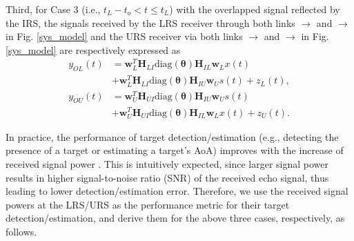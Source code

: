 \documentclass[10pt,final,doublecolumn]{IEEEtran}
\begin{document}
Third, for Case 3 (i.e., $t_L-t_o<t \leq t_L$) with the overlapped signal reflected by the IRS, the signals received by the LRS receiver through both links $\rightarrow$ and $\rightarrow$ in Fig. \ref{sys_model} and the URS
receiver via both links $\rightarrow$ and $\rightarrow$ in Fig. \ref{sys_model} are respectively expressed as
\begin{align}
y_{OL}(t)&=\mathbf{w}_{{L}}^T\mathbf{H}_{LI}
\text{diag}(\boldsymbol{\theta})\mathbf{H}_{IL}\mathbf{w}_{{L}}x(t)\nonumber\\
&+\mathbf{w}_{{L}}^T\mathbf{H}_{LI}\text{diag}(\boldsymbol{\theta})\mathbf{H}_{IU}
\mathbf{w}_{{U}}s(t)+z_{L}(t),\label{lrs3}\\
y_{OU}(t)&=\mathbf{w}_{{U}}^T\mathbf{H}_{UI}
\text{diag}(\boldsymbol{\theta})\mathbf{H}_{IU}\mathbf{w}_{{U}}s(t)\nonumber\\
&+\mathbf{w}_{{U}}^T\mathbf{H}_{UI}\text{diag}(\boldsymbol{\theta})\mathbf{H}_{IL}
\mathbf{w}_{{L}}x(t)+z_{U}(t).\label{lrs33}
\end{align}

In practice, the performance of target detection/estimation (e.g., detecting the presence of a target or estimating a target's AoA) improves with the increase of received signal power \cite{power}. This is intuitively expected, since larger signal power results in higher signal-to-noise ratio (SNR) of the received echo signal, thus leading to lower detection/estimation error. Therefore, we use the received signal powers at the LRS/URS as the performance metric for their target detection/estimation, and derive them for the above three cases, respectively, as follows.
\end{document}
